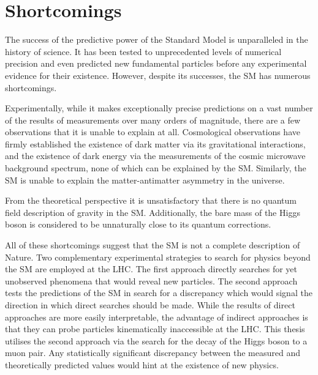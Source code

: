\section{Shortcomings}

The success
of the predictive power of the Standard Model is unparalleled in the history of science.
It has been tested to unprecedented levels of numerical precision and even predicted new
fundamental particles before any experimental evidence for their existence. However,
despite its successes, the SM has numerous shortcomings.

Experimentally, while it makes exceptionally
precise predictions on a vast number of the results of measurements over many orders
of magnitude, there are a few observations that it is unable to explain at all.
Cosmological observations have firmly established the existence of dark matter via its
gravitational interactions, and the existence of dark energy via the measurements of
the cosmic microwave background spectrum, none of which can be explained by the SM.
Similarly, the SM is unable to explain the matter-antimatter asymmetry in the universe.

From the theoretical perspective it is unsatisfactory that there is no quantum field description of gravity
in the SM. Additionally, the bare mass of the Higgs boson is considered to be
unnaturally close to its quantum corrections.

All of these shortcomings suggest that the SM is not a complete description of Nature.
Two complementary experimental strategies to search for physics beyond the SM are
employed at the LHC. The first approach directly searches
for yet unobserved phenomena that would reveal new particles. The second approach tests
the predictions of the SM in search for a discrepancy which would signal the direction
in which direct searches should be made. While the results of direct approaches are
more easily interpretable, the advantage of indirect approaches is that they can probe
particles kinematically inaccessible at the LHC. This thesis utilises the second
approach via the search for the decay of the Higgs boson to a muon pair. Any
statistically significant discrepancy between the measured and theoretically predicted
values would hint at the existence of new physics.

